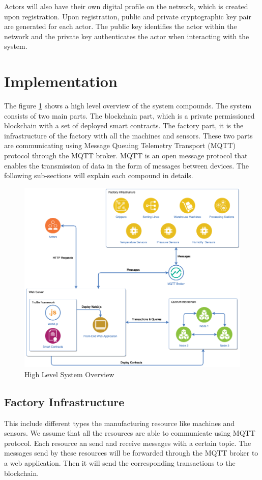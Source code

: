 \documentclass[runningheads]{llncs}
\begin{document}
\noindent Actors will also have their own digital profile on the network, which is created upon registration. Upon registration,  public and private cryptographic key pair are generated for each actor. The public key identifies the actor within the network and the private key authenticates the actor when interacting with the system.

\newpage
\section{Implementation}
The figure \ref{fig:system_overview} shows a high level overview of the system compounds. The system consists of two main parts. The blockchain part, which is a private permissioned blockchain with a set of deployed smart contracts. The factory part, it is the infrastructure of the factory with all the machines and sensors. These two parts are communicating using Message Queuing Telemetry Transport (MQTT) protocol through the MQTT broker. MQTT is an open message protocol that enables the transmission of data in the form of messages between devices. The following sub-sections will explain each compound in details.

\begin{figure}
\centering
\includegraphics[width=1\textwidth]{figures/system_overview_2.png}
\caption{High Level System Overview}
\label{fig:system_overview}
\end{figure}

\subsection{Factory Infrastructure}
This include different types the manufacturing resource like machines and sensors. We assume that all the resources are able to communicate using MQTT protocol. Each resource an send and receive messages with a certain topic. The messages send by these resources will be forwarded through the MQTT broker to a web application. Then it will send the corresponding transactions to the blockchain.
\end{document}
